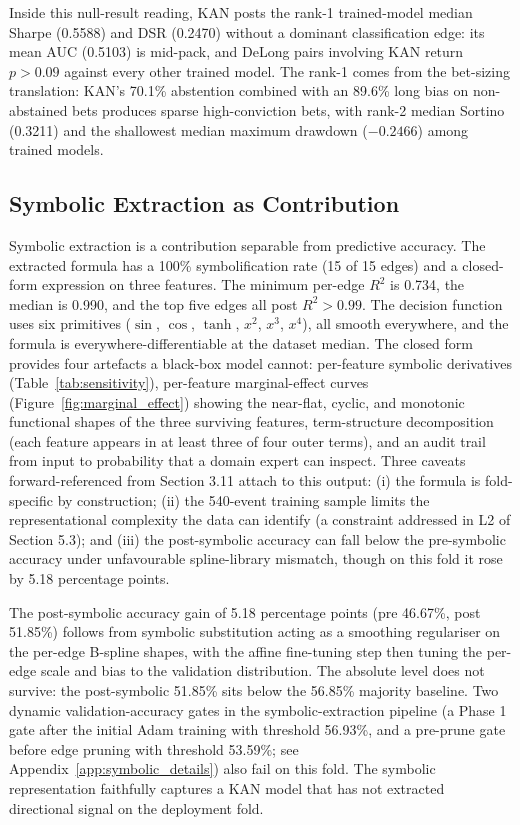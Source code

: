 Inside this null-result reading, KAN posts the rank-1 trained-model median Sharpe (0.5588) and DSR (0.2470) without a dominant classification edge: its mean AUC (0.5103) is mid-pack, and DeLong pairs involving KAN return $p > 0.09$ against every other trained model. The rank-1 comes from the bet-sizing translation: KAN's 70.1\% abstention combined with an 89.6\% long bias on non-abstained bets produces sparse high-conviction bets, with rank-2 median Sortino (0.3211) and the shallowest median maximum drawdown ($-0.2466$) among trained models.


\subsection{Symbolic Extraction as Contribution}\label{subsec:disc_symbolic}

Symbolic extraction is a contribution separable from predictive accuracy. The extracted formula has a 100\% symbolification rate (15 of 15 edges) and a closed-form expression on three features. The minimum per-edge $R^2$ is 0.734, the median is 0.990, and the top five edges all post $R^2 > 0.99$. The decision function uses six primitives ($\sin$, $\cos$, $\tanh$, $x^2$, $x^3$, $x^4$), all smooth everywhere, and the formula is everywhere-differentiable at the dataset median. The closed form provides four artefacts a black-box model cannot: per-feature symbolic derivatives (Table~\ref{tab:sensitivity}), per-feature marginal-effect curves (Figure~\ref{fig:marginal_effect}) showing the near-flat, cyclic, and monotonic functional shapes of the three surviving features, term-structure decomposition (each feature appears in at least three of four outer terms), and an audit trail from input to probability that a domain expert can inspect. Three caveats forward-referenced from Section 3.11 attach to this output: (i) the formula is fold-specific by construction; (ii) the 540-event training sample limits the representational complexity the data can identify (a constraint addressed in L2 of Section 5.3); and (iii) the post-symbolic accuracy can fall below the pre-symbolic accuracy under unfavourable spline-library mismatch, though on this fold it rose by 5.18 percentage points.

The post-symbolic accuracy gain of 5.18 percentage points (pre 46.67\%, post 51.85\%) follows from symbolic substitution acting as a smoothing regulariser on the per-edge B-spline shapes, with the affine fine-tuning step then tuning the per-edge scale and bias to the validation distribution. The absolute level does not survive: the post-symbolic 51.85\% sits below the 56.85\% majority baseline. Two dynamic validation-accuracy gates in the symbolic-extraction pipeline (a Phase 1 gate after the initial Adam training with threshold 56.93\%, and a pre-prune gate before edge pruning with threshold 53.59\%; see Appendix~\ref{app:symbolic_details}) also fail on this fold. The symbolic representation faithfully captures a KAN model that has not extracted directional signal on the deployment fold.


